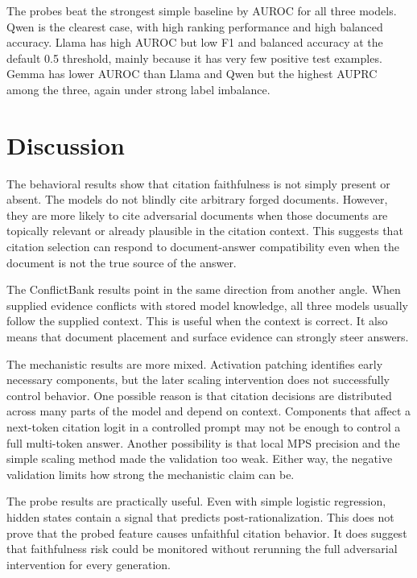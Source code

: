 \documentclass[11pt]{article}
\begin{document}
The probes beat the strongest simple baseline by AUROC for all three models. Qwen is the clearest case, with high ranking performance and high balanced accuracy. Llama has high AUROC but low F1 and balanced accuracy at the default 0.5 threshold, mainly because it has very few positive test examples. Gemma has lower AUROC than Llama and Qwen but the highest AUPRC among the three, again under strong label imbalance.

\section{Discussion}
\label{sec:discussion}

The behavioral results show that citation faithfulness is not simply present or absent. The models do not blindly cite arbitrary forged documents. However, they are more likely to cite adversarial documents when those documents are topically relevant or already plausible in the citation context. This suggests that citation selection can respond to document-answer compatibility even when the document is not the true source of the answer.

The ConflictBank results point in the same direction from another angle. When supplied evidence conflicts with stored model knowledge, all three models usually follow the supplied context. This is useful when the context is correct. It also means that document placement and surface evidence can strongly steer answers.

The mechanistic results are more mixed. Activation patching identifies early necessary components, but the later scaling intervention does not successfully control behavior. One possible reason is that citation decisions are distributed across many parts of the model and depend on context. Components that affect a next-token citation logit in a controlled prompt may not be enough to control a full multi-token answer. Another possibility is that local MPS precision and the simple scaling method made the validation too weak. Either way, the negative validation limits how strong the mechanistic claim can be.

The probe results are practically useful. Even with simple logistic regression, hidden states contain a signal that predicts post-rationalization. This does not prove that the probed feature causes unfaithful citation behavior. It does suggest that faithfulness risk could be monitored without rerunning the full adversarial intervention for every generation.
\end{document}

